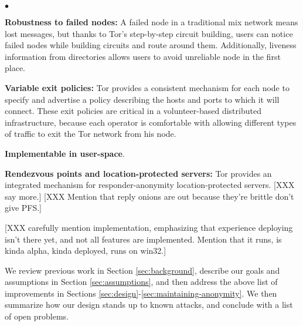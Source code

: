 \documentclass[times,10pt,twocolumn]{article}
\newenvironment{tightlist}{\begin{list}{$\bullet$}{
  \setlength{\itemsep}{0mm}
    \setlength{\parsep}{0mm}
    }}{\end{list}}
\begin{document}
\begin{tightlist}
\item \textbf{Robustness to failed nodes:} A failed node in a traditional
mix network means lost messages, but thanks to Tor's step-by-step
circuit building, users can notice failed
nodes while building circuits and route around them.  Additionally,
liveness information from directories allows users to avoid
unreliable node in the first place.
%

\item \textbf{Variable exit policies:} Tor provides a consistent
mechanism  for
each node to specify and advertise a policy describing the hosts and
ports to which it will connect. These exit policies
are critical in a volunteer-based distributed infrastructure, because
each operator is comfortable with allowing different types of traffic
to exit the Tor network from his node.

\item \textbf{Implementable in user-space}.

\item \textbf{Rendezvous points and location-protected servers:} Tor
provides an integrated mechanism for responder-anonymity
location-protected servers.  [XXX say more.]
[XXX Mention that reply onions are out because they're brittle don't give PFS.]

\end{tightlist}

[XXX carefully mention implementation, emphasizing that experience
deploying isn't there yet, and not all features are implemented.
Mention that it runs, is kinda alpha, kinda deployed, runs on win32.]

We review previous work in Section \ref{sec:background}, describe
our goals and assumptions in Section \ref{sec:assumptions},
and then address the above list of improvements in Sections
\ref{sec:design}-\ref{sec:maintaining-anonymity}. We then summarize
how our design stands up to known attacks, and conclude with a list of
open problems.
\end{document}
